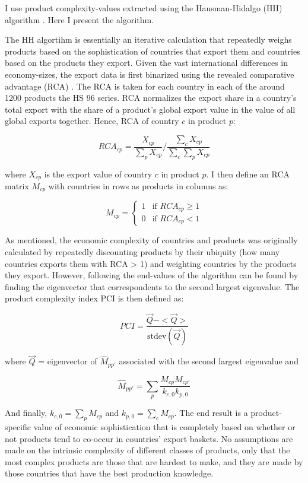 \documentclass[11pt]{article}
\begin{document}
\begin{appendices}
I use product complexity-values extracted using the Hausman-Hidalgo (HH) algorithm \citep{hidalgo_building_2009}. Here I present the algorithm. 

The HH algortihm is essentially an iterative calculation that repeatedly weighs products based on the sophistication of countries that export them and countries based on the products they export. Given the vast international differences in economy-sizes, the export data is first binarized using the revealed comparative advantage (RCA) \citep{balassa_trade_1965}. The RCA is taken for each country in each of the around 1200 products the HS 96 series. RCA normalizes the export share in a country's total export with the share of a product's global export value in the value of all global exports together. Hence, RCA of country \(c\) in product \(p\):

\[
RCA_{cp} = \frac{X_{cp}}{\sum_p X_{cp}} \bigg/ \frac{\sum_c X_{cp}}{\sum_c \sum_p X_{cp}}
\]

where \(X_{cp}\) is the export value of country \(c\) in product \(p\). I then define an RCA matrix \(M_{cp}\) with countries in rows as products in columns as:

\[
M_{cp} = \begin{cases}
1 & \text{if } RCA_{cp} \geq 1 \\
0 & \text{if } RCA_{cp} < 1
\end{cases}
\]

As mentioned, the economic complexity of countries and products was originally calculated by repeatedly discounting products by their ubiquity (how many countries exports them with RCA > 1) and weighting countries by the products they export. However, following \cite{hausmann_atlas_2013} the end-values of the algorithm can be found by finding the eigenvector that correspondents to the second largest eigenvalue. The product complexity index PCI is then defined as:

\[
  PCI = \frac{\vec{Q} - < \vec{Q} >}{\text{stdev}(\vec{Q})}
\]

 where \(\vec{Q}\) = eigenvector of \(\hat{M}_{pp'}\) associated with the second largest eigenvalue and

\[
\hat{M}_{pp'} = \sum_p \frac{M_{cp}M_{cp'}}{k_{c,0}k_{p,0}}
\]

And finally, \(k_{c,0} = \sum_p M_{cp}\) and \(k_{p,0} = \sum_c M_{cp}\). The end result is a product-specific value of economic sophistication that is completely based on whether or not products tend to co-occur in countries' export baskets. No assumptions are made on the intrinsic complexity of different classes of products, only that the most complex products are those that are hardest to make, and they are made by those countries that have the best production knowledge. 


\end{appendices}
\end{document}
